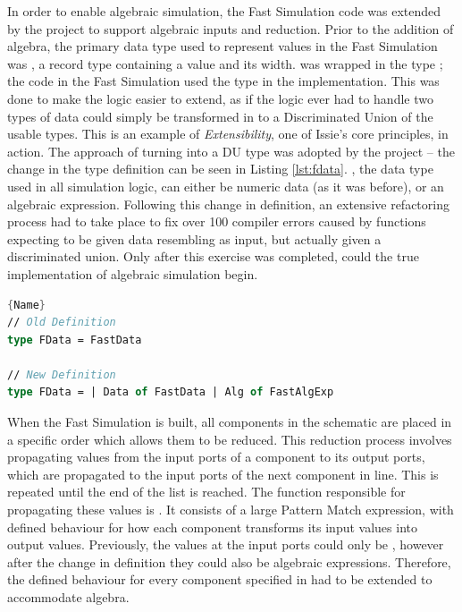 In order to enable algebraic simulation, the Fast Simulation code was extended by the project to support algebraic inputs and reduction. 
Prior to the addition of algebra, the primary data type used to represent values in the Fast Simulation was , a record type containing a value and its width.  was wrapped in the type ; the code in the Fast Simulation used the  type in the implementation. This was done to make the logic easier to extend, as if the logic ever had to handle two types of data  could simply be transformed in to a Discriminated Union of the usable types. This is an example of \textit{Extensibility}, one of Issie's core principles, in action. The approach of turning  into a DU type was adopted by the project -- the change in the type definition can be seen in Listing \ref{lst:fdata}. , the data type used in all simulation logic, can either be numeric data (as it was before), or an algebraic expression. Following this change in definition, an extensive refactoring process had to take place to fix over 100 compiler errors caused by functions expecting to be given data resembling  as input, but actually given a discriminated union. Only after this exercise was completed, could the true implementation of algebraic simulation begin. 
\begin{lstlisting}[caption=Change in definition of \codestyle{FData},frame=tlrb, language=FSharp, label=lst:fdata]{Name}
// Old Definition
type FData = FastData

// New Definition
type FData = | Data of FastData | Alg of FastAlgExp
\end{lstlisting}

When the Fast Simulation is built, all components in the schematic are placed in a specific order which allows them to be reduced. This reduction process involves propagating values from the input ports of a component to its output ports, which are propagated to the input ports of the next component in line. This is repeated until the end of the list is reached.
The function responsible for propagating these values is . It consists of a large Pattern Match expression, with defined behaviour for how each component transforms its input values into output values. Previously, the values at the input ports could only be , however after the change in definition they could also be algebraic expressions. Therefore, the defined behaviour for every component specified in  had to be extended to accommodate algebra.

